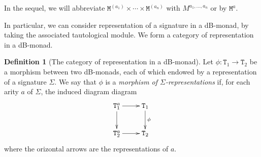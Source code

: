\documentclass[a4paper,twoside,12pt]{article}
\theoremstyle{definition}
\newtheorem{definition}{Definition}
\theoremstyle{remark}
\theoremstyle{example}
\newcommand{\TT}{\mathtt{T}}
\newcommand{\MM}{\mathtt{M}}
\begin{document}
In the sequel, we will abbreviate
$\MM^{(a_1)}\times\cdots\times\MM^{(a_n)}$ with $M^{a_1,\dots,a_n}$ or
by $\MM^a$.

In particular, we can consider representation of a signature in a
dB-monad, by taking the associated tautological module.  We form a
category of representation in a dB-monad.

\begin{definition}[The category of representation in a dB-monad]
  Let $\phi \colon \TT_1 \to \TT_2$ be a morphism between two
  dB-monads, each of which endowed by a representation of a signature
  $\Sigma$.  We say that $\phi$ is a \emph{morphism of
    $\Sigma$-representations} if, for each arity $a$ of $\Sigma$, the
  induced diagram diagram
  \begin{equation*}
    \xymatrix{
      \TT_1^a\ar[d]\ar[r] & \TT_1\ar[d]^\phi \\
      \TT_2^a \ar[r] & \TT_2}
  \end{equation*}
  where the orizontal arrows are the representations of $a$.
\end{definition}


%

\end{document}
